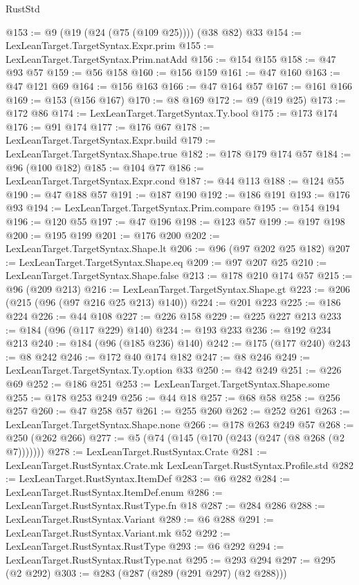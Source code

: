 \begin{lexlean}{RustStd}
\begin{coremodule}
{\begin{coremodule}
{{{{{{{{{{@153 := @9 (@19 (@24 (@75 (@109 @25)))) (@38 @82) @33
@154 := LexLeanTarget.TargetSyntax.Expr.prim
@155 := LexLeanTarget.TargetSyntax.Prim.natAdd
@156 := @154 @155
@158 := @47 @93 @57
@159 := @56 @158
@160 := @156 @159
@161 := @47 @160
@163 := @47 @121 @69
@164 := @156 @163
@166 := @47 @164 @57
@167 := @161 @166
@169 := @153 (@156 @167)
@170 := @8 @169
@172 := @9 (@19 @25)
@173 := @172 @86
@174 := LexLeanTarget.TargetSyntax.Ty.bool
@175 := @173 @174
@176 := @91 @174
@177 := @176 @67
@178 := LexLeanTarget.TargetSyntax.Expr.build
@179 := LexLeanTarget.TargetSyntax.Shape.true
@182 := @178 @179 @174 @57
@184 := @96 (@100 @182)
@185 := @104 @77
@186 := LexLeanTarget.TargetSyntax.Expr.cond
@187 := @44 @113
@188 := @124 @55
@190 := @47 @188 @57
@191 := @187 @190
@192 := @186 @191
@193 := @176 @93
@194 := LexLeanTarget.TargetSyntax.Prim.compare
@195 := @154 @194
@196 := @120 @55
@197 := @47 @196
@198 := @123 @57
@199 := @197 @198
@200 := @195 @199
@201 := @176 @200
@202 := LexLeanTarget.TargetSyntax.Shape.lt
@206 := @96 (@97 @202 @25 @182)
@207 := LexLeanTarget.TargetSyntax.Shape.eq
@209 := @97 @207 @25
@210 := LexLeanTarget.TargetSyntax.Shape.false
@213 := @178 @210 @174 @57
@215 := @96 (@209 @213)
@216 := LexLeanTarget.TargetSyntax.Shape.gt
@223 := @206 (@215 (@96 (@97 @216 @25 @213) @140))
@224 := @201 @223
@225 := @186 @224
@226 := @44 @108
@227 := @226 @158
@229 := @225 @227 @213
@233 := @184 (@96 (@117 @229) @140)
@234 := @193 @233
@236 := @192 @234 @213
@240 := @184 (@96 (@185 @236) @140)
@242 := @175 (@177 @240)
@243 := @8 @242
@246 := @172 @40 @174 @182
@247 := @8 @246
@249 := LexLeanTarget.TargetSyntax.Ty.option @33
@250 := @42 @249
@251 := @226 @69
@252 := @186 @251
@253 := LexLeanTarget.TargetSyntax.Shape.some
@255 := @178 @253 @249
@256 := @44 @18
@257 := @68 @58
@258 := @256 @257
@260 := @47 @258 @57
@261 := @255 @260
@262 := @252 @261
@263 := LexLeanTarget.TargetSyntax.Shape.none
@266 := @178 @263 @249 @57
@268 := @250 (@262 @266)
@277 := @5 (@74 (@145 (@170 (@243 (@247 (@8 @268 (@2 @7)))))))
@278 := LexLeanTarget.RustSyntax.Crate
@281 := LexLeanTarget.RustSyntax.Crate.mk LexLeanTarget.RustSyntax.Profile.std
@282 := LexLeanTarget.RustSyntax.ItemDef
@283 := @6 @282
@284 := LexLeanTarget.RustSyntax.ItemDef.enum
@286 := LexLeanTarget.RustSyntax.RustType.fn @18
@287 := @284 @286
@288 := LexLeanTarget.RustSyntax.Variant
@289 := @6 @288
@291 := LexLeanTarget.RustSyntax.Variant.mk @52
@292 := LexLeanTarget.RustSyntax.RustType
@293 := @6 @292
@294 := LexLeanTarget.RustSyntax.RustType.nat
@295 := @293 @294
@297 := @295 (@2 @292)
@303 := @283 (@287 (@289 (@291 @297) (@2 @288)))
}}}}}}}}}}
\end{coremodule}}
\end{coremodule}
\end{lexlean}
